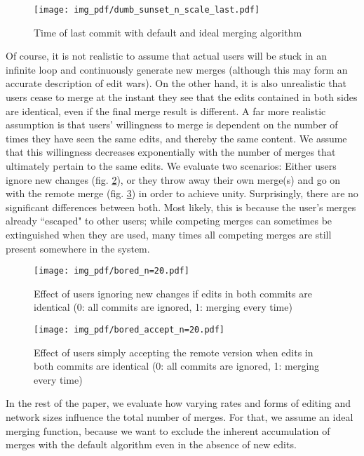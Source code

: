 \documentclass[conference,a4paper]{IEEEtran}
\begin{document}
\begin{figure}
  \texttt{[image: img\_pdf/dumb\_sunset\_n\_scale\_last.pdf]}
  \caption{Time of last commit with default and ideal merging algorithm}
  \label{fig:dumb_sunset}
\end{figure}

Of course, it is not realistic to assume that actual users will be stuck in an infinite loop and continuously generate new merges (although this may form an accurate description of edit wars). On the other hand, it is also unrealistic that users cease to merge at the instant they see that the edits contained in both sides are identical, even if the final merge result is different. A far more realistic assumption is that users' willingness to merge is dependent on the number of times they have seen the same edits, and thereby the same content. We assume that this willingness decreases exponentially with the number of merges that ultimately pertain to the same edits. We evaluate two scenarios:
Either users ignore new changes (fig. \ref{fig:bored}), or they throw away their own merge(s) and go on with the remote merge (fig. \ref{fig:bored_accept}) in order to achieve unity. Surprisingly, there are no significant differences between both. Most likely, this is because the user's merges already ``escaped" to other users; while competing merges can sometimes be extinguished when they are used, many times all competing merges are still present somewhere in the system.

\begin{figure}
  \texttt{[image: img\_pdf/bored\_n=20.pdf]}
  \caption{Effect of users ignoring new changes if edits in both commits are identical (0: all commits are ignored, 1: merging every time)}
  \label{fig:bored}
\end{figure}

\begin{figure}
  \texttt{[image: img\_pdf/bored\_accept\_n=20.pdf]}
  \caption{Effect of users simply accepting the remote version when edits in both commits are identical (0: all commits are ignored, 1: merging every time)}
  \label{fig:bored_accept}
\end{figure}

In the rest of the paper, we evaluate how varying rates and forms of editing and network sizes influence the total number of merges. For that, we assume an ideal merging function, because we want to exclude the inherent accumulation of merges with the default algorithm even in the absence of new edits.
\end{document}
